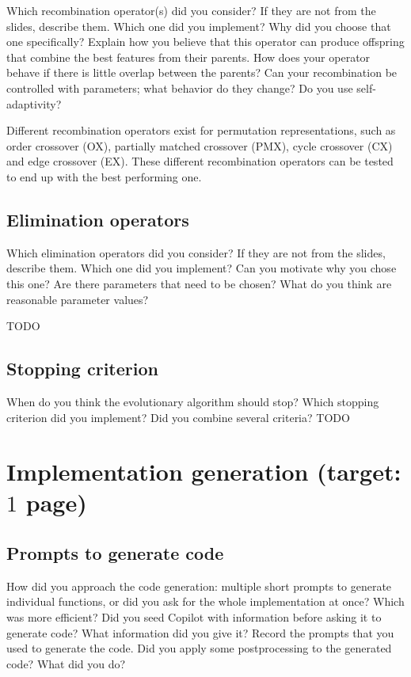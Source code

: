 \documentclass[a4paper,10pt]{article}
\newcommand{\ReplaceMe}[1]{{\color{blue}#1}}
\begin{document}
\ReplaceMe{Which recombination operator(s) did you consider? If they are not from the slides, describe them. Which one did you implement? Why did you choose that one specifically? Explain how you believe that this operator can produce offspring that combine the best features from their parents. How does your operator behave if there is little overlap between the parents? Can your recombination be controlled with parameters; what behavior do they change? Do you use self-adaptivity?}

Different recombination operators exist for permutation representations, such as order crossover (OX), partially matched crossover (PMX), cycle crossover (CX) and edge crossover (EX). These different recombination operators can be tested to end up with the best performing one.

\subsection{Elimination operators}

\ReplaceMe{Which elimination operators did you consider? If they are not from the slides, describe them. Which one did you implement? Can you motivate why you chose this one? Are there parameters that need to be chosen? What do you think are reasonable parameter values?} 

TODO
\subsection{Stopping criterion}

\ReplaceMe{When do you think the evolutionary algorithm should stop? Which stopping criterion did you implement? Did you combine several criteria?}
TODO
\section{Implementation generation \hfill(target: $1$ page)}

\subsection{Prompts to generate code}
\ReplaceMe{How did you approach the code generation: multiple short prompts to generate individual functions, or did you ask for the whole implementation at once? Which was more efficient? Did you seed Copilot with information before asking it to generate code? What information did you give it? Record the prompts that you used to generate the code. Did you apply some postprocessing to the generated code? What did you do?}
\end{document}
